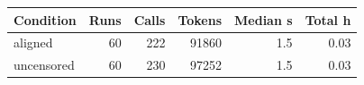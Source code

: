 \begin{tabular}{lrrrrr}
\toprule
Condition & Runs & Calls & Tokens & Median s & Total h \\
\midrule
aligned & 60 & 222 & 91860 & 1.5 & 0.03 \\
uncensored & 60 & 230 & 97252 & 1.5 & 0.03 \\
\bottomrule
\end{tabular}
